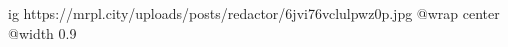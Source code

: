  
 
 
 
 

\ifcmt
  ig https://mrpl.city/uploads/posts/redactor/6jvi76vclulpwz0p.jpg
  @wrap center
  @width 0.9
\fi
